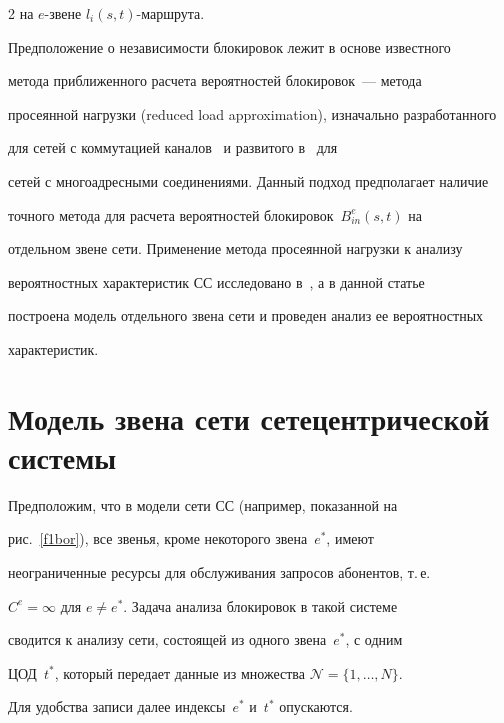 \begin{multicols}{2}
на $e$-звене  $l_i(s,t)$-маршрута.


  


  Предположение о независимости блокировок лежит в основе известного 


метода приближенного расчета вероятностей блокировок~--- метода 


просеянной нагрузки (reduced load approximation), изначально разработанного 


для сетей с коммутацией каналов~\cite{3bor} и развитого в~\cite{4bor} для 


сетей с многоадресными соединениями. Данный подход предполагает наличие 


точного метода для расчета вероятностей блокировок~$B_{in}^e(s,t)$ на 


отдельном звене сети. Применение метода просеянной нагрузки к анализу 


вероятностных характеристик СС исследовано в~\cite{5bor}, а в данной статье 


построена модель отдельного звена сети и проведен анализ ее вероятностных 


характеристик.


  


  \section{Модель звена сети сетецентрической системы}


  


  Предположим, что в модели сети СС (например, показанной на 


рис.~\ref{f1bor}), все звенья, кроме некоторого звена~$e^*$, имеют 


неограниченные ресурсы для обслуживания запросов абонентов, т.\,е.\ 


$C^e=\infty$ для $e\not= e^*$. Задача анализа блокировок в такой системе 


сводится к анализу сети, состоящей из одного звена~$e^*$, с одним 


ЦОД~$t^*$, который передает данные из множества ${\mathcal N} =\{1,\ldots ,N\}$. 


Для удобства записи далее индексы~$e^*$ и~$t^*$ опускаются.





\medskip






\end{multicols}
